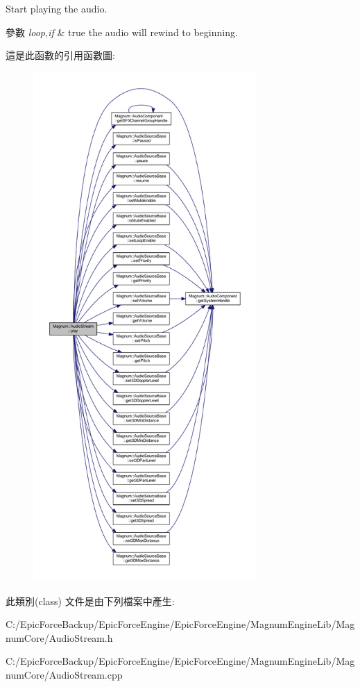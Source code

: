Start playing the audio. 


\begin{DoxyParams}{參數}
{\em loop,if} & true the audio will rewind to beginning. \\
\hline
\end{DoxyParams}


這是此函數的引用函數圖\+:\nopagebreak
\begin{figure}[H]
\begin{center}
\leavevmode
\includegraphics[height=550pt]{class_magnum_1_1_audio_stream_afe27165ca951ac7e01914065ffecf741_cgraph}
\end{center}
\end{figure}




此類別(class) 文件是由下列檔案中產生\+:\begin{DoxyCompactItemize}
\item 
C\+:/\+Epic\+Force\+Backup/\+Epic\+Force\+Engine/\+Epic\+Force\+Engine/\+Magnum\+Engine\+Lib/\+Magnum\+Core/Audio\+Stream.\+h\item 
C\+:/\+Epic\+Force\+Backup/\+Epic\+Force\+Engine/\+Epic\+Force\+Engine/\+Magnum\+Engine\+Lib/\+Magnum\+Core/Audio\+Stream.\+cpp\end{DoxyCompactItemize}
